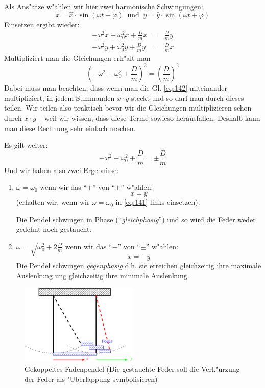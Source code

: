 Als Ans"atze w"ahlen wir hier zwei harmonische Schwingungen:
\begin{equation}
   \label{eq:141}
   x = \hat x \cdot \sin (\omega t + \varphi) ~\text{ und } ~
   y = \hat y \cdot \sin (\omega t + \varphi)
\end{equation}
Einsetzen ergibt wieder:
\begin{eqnarray}
   \label{eq:142}
   -\omega^2 x + \omega_0^2 x + \frac{D}{m} x &=& \frac{D}{m}y\\
   -\omega^2 y + \omega_0^2 y + \frac{D}{m} y &=& \frac{D}{m}x
\end{eqnarray}
 Multipliziert man die
Gleichungen erh"alt man 
\begin{equation}
   \label{eq:143}
  \left  (-\omega^2 + \omega_0^2 + \frac{D}{m} \right ) ^2 = \left ( \frac{D}{m}
   \right )^2
\end{equation}
Dabei muss man beachten, dass wenn man die Gl. \eqref{eq:142}
miteinander multipliziert, in jedem Summanden $x\cdot y$ steckt und so
darf man durch dieses teilen. Wir teilen also praktisch bevor wir die
Gleichungen multiplizieren schon durch $x\cdot y$ -- weil wir wissen, dass
diese Terme sowieso herausfallen. Deshalb kann man diese Rechnung sehr
einfach machen. 

Es gilt weiter:
\begin{equation}
   \label{eq:144}
   -\omega^2 + \omega_0^2 + \frac{D}{m} = \pm \frac{D}{m}
\end{equation}
Und wir haben also zwei Ergebnisse:
\begin{enumerate}[F{a}ll I]
\item $\omega = \omega_0$ wenn wir das "`$+$"' von "`$\pm$"' w"ahlen:
$$
x = y
$$
(erhalten wir, wenn wir $\omega = \omega_0$ in \eqref{eq:141} links
einsetzen).

Die Pendel schwingen in Phase
("`\emph{gleichphasig}"') und so wird die Feder weder gedehnt noch
gestaucht.
\item $\omega = \sqrt{ \omega_0^2 + 2\frac{D}{m} }$ wenn wir das
   "`$-$"' von "`$\pm$"' w"ahlen:
$$
x = -y
$$
Die Pendel schwingen \emph{gegenphasig} d.h. sie
erreichen gleichzeitig ihre maximale Auslenkung ung gleichzeitig ihre
minimale Auslenkung.
\end{enumerate}



\begin{figure}
   \centering
   \includegraphics[width=0.5\textwidth]{bilder/gekoppelt}
   \caption[Gekoppeltes Fadenpendel]{Gekoppeltes Fadenpendel (Die
     gestauchte Feder soll die Verk"urzung der Feder als "Uberlappung
     symbolisieren)}
   \label{abb_gekoppelt}
\end{figure}

